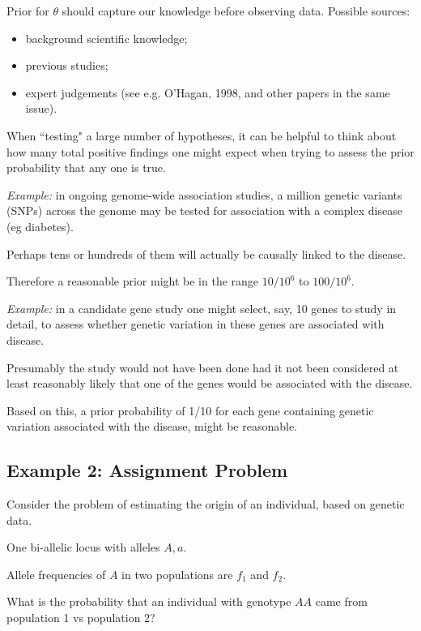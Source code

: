 Prior for $\theta $
 should capture our knowledge before observing data.  Possible sources:
\begin{itemize}
    \item background scientific knowledge;
    \item previous studies;
    \item expert judgements (see e.g. O'Hagan, 1998, and other papers in the same
issue).
\end{itemize}

\es\bs

When ``testing" a large number of hypotheses, it can be helpful to think about how
many total positive findings one might expect when trying to assess the prior probability that
any one is true.

{\it Example:} in ongoing genome-wide association studies, a million genetic variants (SNPs) across the genome may be tested for association with a complex disease (eg diabetes). 

Perhaps tens or hundreds of them will actually be causally linked to the disease.

Therefore a reasonable prior might be in the range $10/ 10^6$ to $100/10^6$.

\es\bs

{\it Example:} in a candidate gene study one might select, say, 10 genes to study in detail,
to assess whether genetic variation in these genes are associated with disease. 

Presumably the study would not have been done had it not been considered at least
reasonably likely that one of the genes would be associated with the disease.

Based on this, a prior probability of 1/10 for each gene containing genetic variation associated with the disease, might be reasonable.

    \es\bs

\subsection*{Example 2: Assignment Problem}

Consider the problem of estimating the origin of an individual, based
on genetic data. 

One bi-allelic locus with alleles $A, a$.

Allele frequencies of $A$ in two populations are $f_1$ and $f_2$.

What is the probability that an individual with genotype $AA$ came
from population 1 vs population 2?

